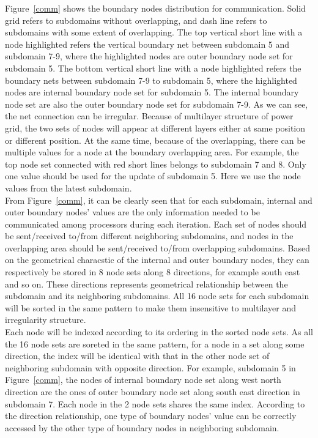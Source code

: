 \documentclass{sig-alternate}
\begin{document}
	Figure~\ref{comm} shows the boundary nodes distribution for communication. Solid grid refers to subdomains without overlapping, 
	and dash line refers to subdomains with some extent of overlapping. The
	top vertical short line with a node highlighted refers the vertical boundary net between subdomain 5 and subdomain 7-9, where the
	highlighted nodes are outer boundary node set for subdomain 5. The bottom 
	vertical short line with a node highlighted refers the boundary nets between subdomain 7-9 to subdomain 5, where the highlighted 
	nodes are internal boundary node set for subdomain 5. The internal boundary node set are also the outer boundary node set for 
	subdomain 7-9. As we can see, the net connection can be irregular. Because of multilayer structure of
	power grid, the two sets of nodes will appear at different layers either at same position or different position. At the
	same time, because of the overlapping, there can be multiple values for a node at the boundary overlapping area. For example, 
	the top node set connected with red short lines belongs to subdomain 7 and 8. Only one value should be used for the update of 
	subdomain 5. Here we use the node values from the latest subdomain.\\

	From Figure~\ref{comm}, it can be clearly seen that for each subdomain, internal and outer boundary nodes' values 
	are the only information needed to be communicated among processors during each iteration. Each set of nodes should be 
	sent/received to/from different neighboring subdomains, and nodes in the overlapping area should be sent/received to/from  
	overlapping subdomains. Based on the geometrical characstic of the internal and outer boundary nodes, they can respectively 
	be stored in 8 node sets along 8 directions, for example south east and so on. These directions represents geometrical 
	relationship between the subdomain and its neighboring subdomains. All 16 node sets for each subdomain will be sorted in the 
	same pattern to make them insensitive to multilayer and irregularity structure.\\ 

	Each node will be
	indexed according to its ordering in the sorted node sets. As all the 16 node sets are soreted in the same pattern, for a node in
	a set along some direction, the index will be identical with that in the other node set of neighboring subdomain with opposite
	direction. For example, subdomain 5 in Figure~\ref{comm}, the nodes of internal boundary node set along west north 
	direction are the ones of outer boundary node set along south east direction in subdomain 7. Each node in the 2 node sets 
	shares the same index. According to the direction relationship, one type of boundary nodes' value can be correctly accessed by 
	the other type of boundary nodes in neighboring subdomain.\\
\end{document}
